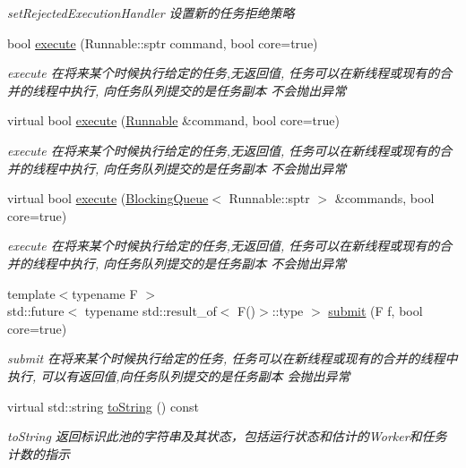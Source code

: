 \begin{DoxyCompactItemize}
\begin{DoxyCompactList}\small\item\em set\+Rejected\+Execution\+Handler 设置新的任务拒绝策略 \end{DoxyCompactList}\item 
bool \hyperlink{classThreadPoolExecutor_a4dac3c2435919af5d77aa36069d35bc7}{execute} (Runnable\+::sptr command, bool core=true)
\begin{DoxyCompactList}\small\item\em execute 在将来某个时候执行给定的任务,无返回值, 任务可以在新线程或现有的合并的线程中执行, 向任务队列提交的是任务副本 不会抛出异常 \end{DoxyCompactList}\item 
virtual bool \hyperlink{classThreadPoolExecutor_a523df0545790ef03a82623b05e3b20f9}{execute} (\hyperlink{classRunnable}{Runnable} \&command, bool core=true)
\begin{DoxyCompactList}\small\item\em execute 在将来某个时候执行给定的任务,无返回值, 任务可以在新线程或现有的合并的线程中执行, 向任务队列提交的是任务副本 不会抛出异常 \end{DoxyCompactList}\item 
virtual bool \hyperlink{classThreadPoolExecutor_a451bba3f90dbed2ba7e491ebc391b3c6}{execute} (\hyperlink{classBlockingQueue}{Blocking\+Queue}$<$ Runnable\+::sptr $>$ \&commands, bool core=true)
\begin{DoxyCompactList}\small\item\em execute 在将来某个时候执行给定的任务,无返回值, 任务可以在新线程或现有的合并的线程中执行, 向任务队列提交的是任务副本 不会抛出异常 \end{DoxyCompactList}\item 
{\footnotesize template$<$typename F $>$ }\\std\+::future$<$ typename std\+::result\+\_\+of$<$ F()$>$\+::type $>$ \hyperlink{classThreadPoolExecutor_a94834ab6bedcc75111524fec4e928b3f}{submit} (F f, bool core=true)
\begin{DoxyCompactList}\small\item\em submit 在将来某个时候执行给定的任务, 任务可以在新线程或现有的合并的线程中执行, 可以有返回值,向任务队列提交的是任务副本 会抛出异常 \end{DoxyCompactList}\item 
virtual std\+::string \hyperlink{classThreadPoolExecutor_a8e340cec3bb976f7773db103d73189c2}{to\+String} () const
\begin{DoxyCompactList}\small\item\em to\+String 返回标识此池的字符串及其状态，包括运行状态和估计的\+Worker和任务计数的指示 \end{DoxyCompactList}\item 

\end{DoxyCompactItemize}
